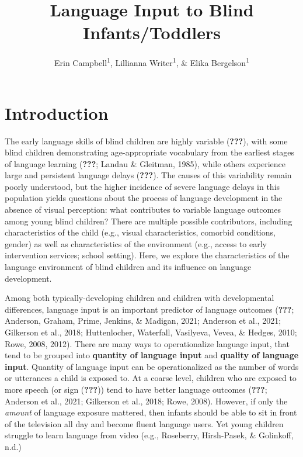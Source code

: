 \documentclass[english,man]{apa6}
\title{Language Input to Blind Infants/Toddlers}
\author{Erin Campbell\textsuperscript{1}, Lillianna Writer\textsuperscript{1}, \& Elika Bergelson\textsuperscript{1}}
\date{}
\affiliation{\vspace{0.5cm}\textsuperscript{1} Department of Psychology \& Neuroscience, Duke University, Durham, NC}
\begin{document}
\maketitle

\hypertarget{introduction}{%
\section{Introduction}\label{introduction}}

The early language skills of blind children are highly variable ({\textbf{???}}), with some blind children demonstrating age-appropriate vocabulary from the earliest stages of language learning ({\textbf{???}}; Landau \& Gleitman, 1985), while others experience large and persistent language delays ({\textbf{???}}). The causes of this variability remain poorly understood, but the higher incidence of severe language delays in this population yields questions about the process of language development in the absence of visual perception: what contributes to variable language outcomes among young blind children? There are multiple possible contributors, including characteristics of the child (e.g., visual characteristics, comorbid conditions, gender) as well as characteristics of the environment (e.g., access to early intervention services; school setting). Here, we explore the characteristics of the language environment of blind children and its influence on language development.

Among both typically-developing children and children with developmental differences, language input is an important predictor of language outcomes ({\textbf{???}}; Anderson, Graham, Prime, Jenkins, \& Madigan, 2021; Anderson et al., 2021; Gilkerson et al., 2018; Huttenlocher, Waterfall, Vasilyeva, Vevea, \& Hedges, 2010; Rowe, 2008, 2012). There are many ways to operationalize language input, that tend to be grouped into \textbf{quantity of language input} and \textbf{quality of language input}. Quantity of language input can be operationalized as the number of words or utterances a child is exposed to. At a coarse level, children who are exposed to more speech (or sign ({\textbf{???}})) tend to have better language outcomes ({\textbf{???}}; Anderson et al., 2021; Gilkerson et al., 2018; Rowe, 2008). However, if only the \emph{amount} of language exposure mattered, then infants should be able to sit in front of the television all day and become fluent language users. Yet young children struggle to learn language from video (e.g., Roseberry, Hirsh-Pasek, \& Golinkoff, n.d.)
\end{document}
